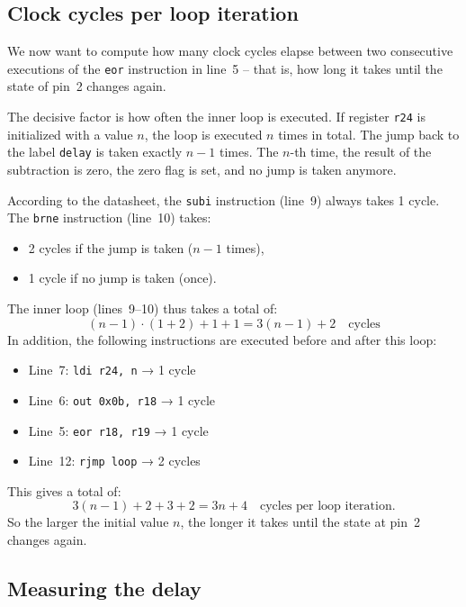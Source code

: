 \documentclass[a4paper,12pt]{article}
\begin{document}
\vspace{53bp}
\subsection{Clock cycles per loop iteration}

We now want to compute how many clock cycles elapse between two consecutive
executions of the \texttt{eor} instruction in line~5 – that is, how long it
takes until the state of pin~2 changes again.

The decisive factor is how often the inner loop is executed. If register
\texttt{r24} is initialized with a value \( n \), the loop is executed
\( n \) times in total. The jump back to the label \texttt{delay} is taken
exactly \( n-1 \) times. The \( n \)-th time, the result of the subtraction
is zero, the zero flag is set, and no jump is taken anymore.

\newpage

\noindent
According to the datasheet, the \texttt{subi} instruction (line~9) always
takes 1 cycle. The \texttt{brne} instruction (line~10) takes:
\begin{itemize}
  \item 2 cycles if the jump is taken (\( n-1 \) times),
  \item 1 cycle if no jump is taken (once).
\end{itemize}
The inner loop (lines~9–10) thus takes a total of:
\[
(n-1) \cdot (1 + 2) + 1 + 1 = 3(n-1) + 2 \quad \text{cycles}
\]
In addition, the following instructions are executed before and after this
loop:
\begin{itemize}
  \item Line~7: \texttt{ldi r24, n} → 1 cycle
  \item Line~6: \texttt{out 0x0b, r18} → 1 cycle
  \item Line~5: \texttt{eor r18, r19} → 1 cycle
  \item Line~12: \texttt{rjmp loop} → 2 cycles
\end{itemize}
This gives a total of:
\[
3(n-1) + 2 + 3 + 2 = 3n + 4 \quad \text{cycles per loop iteration.}
\]
So the larger the initial value \( n \), the longer it takes until the state
at pin~2 changes again.


\vspace{14bp}
\subsection{Measuring the delay}
\end{document}
